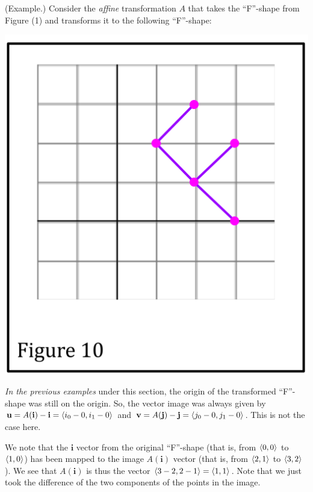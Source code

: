 \documentclass[letterpaper]{article}
\begin{document}
\begin{mdframed}[]
    (Example.) Consider the \emph{affine} transformation $A$ that takes the ``F''-shape from Figure (1) and transforms it to the following ``F''-shape:
    \begin{center}
        \includegraphics[scale=0.3]{../assets/f8.png}
    \end{center}
    \emph{In the previous examples} under this section, the origin of the transformed ``F''-shape was still on the origin. So, the vector image was always given by $\mathbf{u} = A(\mathbf{i}) - \mathbf{i} = \langle i_0 - 0, i_1 - 0 \rangle$ and $\mathbf{v} = A(\mathbf{j}) - \mathbf{j} = \langle j_0 - 0, j_1 - 0 \rangle$. This is not the case here. 
    
    \bigskip
    
    We note that the $\mathbf{i}$ vector from the original ``F''-shape (that is, from $\langle 0, 0 \rangle$ to $\langle 1, 0 \rangle$) has been mapped to the image $A(\mathbf{i})$ vector (that is, from $\langle 2, 1 \rangle$ to $\langle 3, 2 \rangle$). We see that $A(\mathbf{i})$ is thus the vector $\langle 3 - 2, 2 - 1 \rangle = \langle 1, 1 \rangle$. Note that we just took the difference of the two components of the points in the image. 


\end{mdframed}
\end{document}
